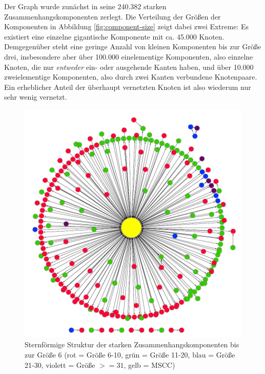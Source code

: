 Der Graph wurde zunächst in seine 240.382 starken
Zusammenhangskomponenten zerlegt. Die Verteilung der
Größen der Komponenten in Abbildung \ref{fig:component-size} zeigt dabei
zwei Extreme: Es existiert eine einzelne gigantische Komponente mit
ca. 45.000 Knoten. Demgegenüber steht eine geringe Anzahl von kleinen
Komponenten bis zur Größe drei, insbesondere aber über 100.000
einelementige Komponenten, also einzelne Knoten, die nur
\emph{entweder} ein- oder ausgehende Kanten haben, und über 10.000
zweielementige Komponenten, also durch zwei Kanten verbundene
Knotenpaare. Ein erheblicher Anteil der überhaupt vernetzten Knoten
ist also wiederum nur sehr wenig vernetzt.

\begin{figure}[th!]
  \centering
  \includegraphics[scale=0.7]{images/component-metagraph-8.pdf}
  \caption{Sternförmige Struktur der starken
    Zusammenhangskomponenten bis zur Größe 6 (rot = Größe 6-10, grün
    = Größe 11-20, blau = Größe 21-30, violett = Größe $>= 31$,
    gelb = MSCC)}
  \label{fig:komponenten-struktur}
\end{figure}

